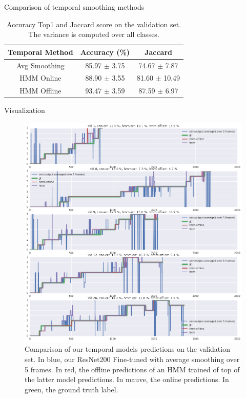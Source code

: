 \begin{frame}{Comparison of temporal smoothing methods}

	\begin{table}
	\begin{center}
		\begin{tabular}{|c|c|c|}
			\hline
			Temporal Method & Accuracy (\%) & Jaccard \\
			\hline\hline
			Avg Smoothing & 85.97 $\pm$ 3.75 & 74.67 $\pm$ 7.87\\
			HMM Online & 88.90 $\pm$ 3.55 & 81.60 $\pm$ 10.49\\
			HMM Offline & 93.47 $\pm$ 3.59 & 87.59 $\pm$ 6.97\\
			\hline
		\end{tabular}
	\end{center}
	\caption{Accuracy Top1 and Jaccard score on the validation set. The variance is computed over all classes.}
	\end{table}

\end{frame}

\begin{frame}{Visualization}

	\begin{figure}
\begin{center}
   \includegraphics[width=1\linewidth]{../report/images/visu.png}
\end{center}
   \caption{Comparison of our temporal models predictions on the validation set. In blue, our ResNet200 Fine-tuned with average smoothing over 5 frames. In red, the offline predictions of an HMM trained of top of the latter model predictions. In mauve, the online predictions. In green, the ground truth label. }
\label{fig:long}
\label{fig:onecol}
\end{figure}	
	
\end{frame}



